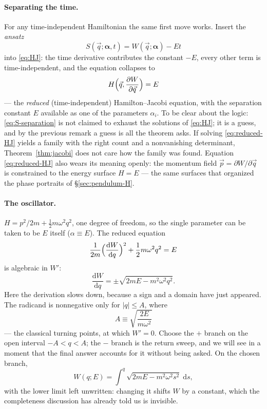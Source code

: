 \documentclass[11pt]{article}
\theoremstyle{plain}
\theoremstyle{definition}
\theoremstyle{remark}
\newcommand{\dd}{\mathrm{d}}
\newcommand{\pd}[2]{\frac{\partial #1}{\partial #2}}
\newcommand{\tot}[2]{\frac{\dd #1}{\dd #2}}
\newcommand{\vq}{\vec{q}}
\newcommand{\vp}{\vec{p}}
\begin{document}
\paragraph{Separating the time.}
For any time-independent Hamiltonian the same first move works. Insert
the \emph{ansatz}
\begin{equation}
  S(\vq; \boldsymbol{\alpha}, t) = W(\vq; \boldsymbol{\alpha}) - E t
  \label{eq:S-separation}
\end{equation}
into \eqref{eq:HJ}: the time derivative contributes the constant $-E$,
every other term is time-independent, and the equation collapses to
\begin{equation}
  H\Bigl(\vq, \pd{W}{\vq}\Bigr) = E
  \label{eq:reduced-HJ}
\end{equation}
--- the \emph{reduced} (time-independent) Hamilton--Jacobi equation,
with the separation constant $E$ available as one of the parameters
$\alpha_i$. To be clear about the logic: \eqref{eq:S-separation} is not
claimed to exhaust the solutions of \eqref{eq:HJ}; it is a guess, and
by the previous remark a guess is all the theorem asks. If solving
\eqref{eq:reduced-HJ} yields a family with the right count and a
nonvanishing determinant, Theorem~\ref{thm:jacobi} does not care how
the family was found. Equation \eqref{eq:reduced-HJ} also wears its
meaning openly: the momentum field $\vp = \partial W/\partial\vq$ is
constrained to the energy surface $H = E$ --- the same surfaces that
organized the phase portraits of \S\ref{sec:pendulum-H}.

\paragraph{The oscillator.}
$H = p^2/2m + \tfrac12 m\omega^2 q^2$, one degree of freedom, so the
single parameter can be taken to be $E$ itself
($\alpha \equiv E$). The reduced equation
\begin{equation}
  \frac{1}{2m}\Bigl(\tot{W}{q}\Bigr)^2 + \frac12 m\omega^2 q^2 = E
\end{equation}
is algebraic in $W'$:
\begin{equation}
  \tot{W}{q} = \pm\sqrt{2mE - m^2\omega^2 q^2} .
  \label{eq:W-prime}
\end{equation}
Here the derivation slows down, because a sign and a domain have just
appeared. The radicand is nonnegative only for $|q| \le A$, where
\begin{equation}
  A \equiv \sqrt{\frac{2E}{m\omega^2}}
\end{equation}
--- the classical turning points, at which $W' = 0$. Choose the $+$
branch on the open interval $-A < q < A$; the $-$ branch is the return
sweep, and we will see in a moment that the final answer
accounts for it without being asked. On the chosen branch,
\begin{equation}
  W(q; E) = \int^{q}\sqrt{2mE - m^2\omega^2 s^2}\;\dd s ,
  \label{eq:W-integral}
\end{equation}
with the lower limit left unwritten: changing it shifts $W$ by a
constant, which the completeness discussion has already told us is
invisible.
\end{document}
